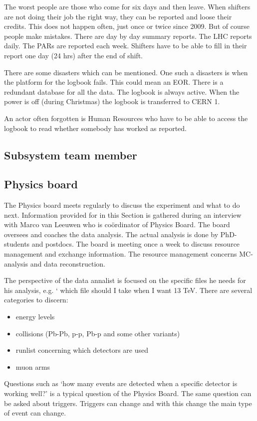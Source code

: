The worst people are those who come for six days and then leave. When shifters are not doing their job the right way, they can be reported and loose their credits. This does not happen often, just once or twice since 2009. But of course people make mistakes. There are day by day summary reports. The LHC reports daily. The PARs are reported each week. Shifters have to be able to fill in their report one day (24 hrs) after the end of shift.

There are some disasters which can be mentioned. One such a disasters is when the platform for the logbook fails. This could mean an EOR. There is a redundant database for all the data. The logbook is always active. When the power is off (during Christmas) the logbook is transferred to CERN 1. 

An actor often forgotten is Human Resources who have to be able to access the logbook to read whether somebody has worked as reported.








\subsection{Subsystem team member}



\subsection{Physics board}
The Physics board meets regularly to discuss the experiment and what to do next. Information provided for in this Section is gathered during an interview with Marco van Leeuwen who is co\"ordinator of Physics Board. The board oversees and coaches the data analysis. The actual analysis is done by PhD-students and postdocs. The board is meeting once a week to discuss resource management and exchange information. The resource management concerns MC-analysis and data reconstruction. 

The perspective of the data annalist is focused on the specific files he needs for his analysis, e.g. ` which file should I take when I want 13 TeV. There are several categories to discern:
\begin{itemize}
  \item energy levels
  \item collisions (Pb-Pb, p-p, Pb-p and some other variants)
  \item runlist concerning which detectors are used
  \item muon arms
\end{itemize}
Questions such as `how many events are detected when a specific detector is working well?' is a typical question of the Physics Board. The same question can be asked about triggers. Triggers can change and with this change the main type of event can change.

